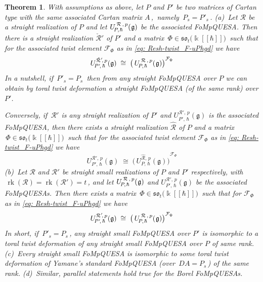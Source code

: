 \documentclass[12pt,reqno,twoside,a4paper]{amsart}
\numberwithin{equation}{section}
\newtheorem{theorem}[lema]{Theorem}
\theoremstyle{definition}
\newtheorem{free text}[lema]{}
\theoremstyle{remark}
\newcommand \rk{\operatorname{rk}}
\newcommand{\R}{{\mathcal R}}
\newcommand{\F}{{\mathcal F}}
\def \kh{{\Bbbk[[\hbar]]}}
\def \lieg{\mathfrak{g}}
\def \lieso{\mathfrak{so}}
\def \uRpPhg{U^{\,\R\,,\,p}_{\!P,\hskip0,7pt\hbar}(\hskip0,5pt\lieg)}
\theoremstyle{plain}
\begin{document}
\begin{theorem}  \label{thm: uRpPhg=twist-uhg}
%
 With assumptions as above, let  $ P $  and  $ P' $  be two matrices
 of Cartan type with the same associated Cartan matrix $ A \, $,
 \,namely  $ \, P_s = P'_s \, $.
%
 \vskip3pt
%
   (a)\,  Let  $ \R $  be a  \textsl{straight}  realization of  $ P $  and let
   $ \uRpPhg $  be the associated FoMpQUESA.  Then there is a  \textsl{straight}  realization  $ \check{\R}' $  of
   $ P' $  and a matrix
   $ \, \Phi \in \! \lieso_t\big(\kh\big) \, $  such that for the
   associated twist element  $ \F_\Phi $  as in
   \eqref{eq: Resh-twist_F-uPhgd}  we have
%
  $$
  U_{\!P'\!,\,\hbar}^{\check{\R}'\!,\,p}(\lieg)  \; \cong \;  {\big(\, \uRpPhg \big)}^{\F_\Phi}
  $$
%
 In a nutshell, if  $ \, P'_s = P_s \, $  then from any
 \textsl{straight}  FoMpQUESA over  $ P $  we can obtain by toral twist deformation a
 \textsl{straight}  FoMpQUESA (of the same rank) over  $ P' $.
                                                                  \par
   Conversely, if  $ \, \R' $  is any  \textsl{straight}
   realization of  $ P' $  and  $  U_{\!P'\!,\,\hbar}^{\R'\!,\,p}(\lieg) $
   is the associated FoMpQUESA, then there exists a  \textsl{straight}
   realization  $ \hat{\R} $  of  $ P $  and a matrix
   $ \, \Phi \in \! \lieso_t\big(\kh\big) \, $
   such that for the associated twist element  $ \F_\Phi $
   as in  \eqref{eq: Resh-twist_F-uPhgd}  we have
  $$
  U_{\!P'\!,\,\hbar}^{\R'\!,\,p}(\lieg)  \; \cong \;
  {\big(\, U_{\!P,\,\hbar}^{\hat{\R},\,p}(\lieg) \big)}^{\F_\Phi}
  $$
%
 \vskip3pt
%
   (b)\,  Let  $ \R $  and  $ \R' $  be  \textsl{straight small}
   realizations of  $ P $  and  $ P' $  respectively, with
   $ \, \rk(\R) = \rk(\R') = t\, $,  and let  $ \uRpPhg $  and
   $ U_{\!P'\!,\,\hbar}^{\R'\!,\,p}(\lieg) $  be the associated FoMpQUESAs.
   Then there exists a matrix  $ \, \Phi \in \! \lieso_t\big(\kh\big) \, $  such that for
%
%
 $ \F_\Phi $  as in  \eqref{eq: Resh-twist_F-uPhgd}  we have
  $$  U_{\!P'\!,\,\hbar}^{\R'\!,\,p}(\lieg)  \; \cong \;  {\big(\, \uRpPhg \big)}^{\F_\Phi}  $$
%
 In short, if  $ \, P'_s = P_s \, $,  any  \textsl{straight small}
 FoMpQUESA over  $ P' $  is isomorphic to a toral twist deformation
 of any  \textsl{straight small}  FoMpQUESA over  $ P $  of same rank.
%
 \vskip3pt
%
   (c)\,  Every  \textsl{straight small}  FoMpQUESA is
   isomorphic to some toral twist deformation of Yamane's standard
   FoMpQUESA (over  $ \, DA = P_s \, $)  of the same rank.
%
 \vskip3pt
%
   (d)\,  Similar, parallel statements hold true for the Borel FoMpQUESAs.
%
\end{theorem}
\end{document}
